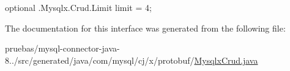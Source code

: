 {\ttfamily optional .Mysqlx.\+Crud.\+Limit limit = 4;} 

The documentation for this interface was generated from the following file\+:\begin{DoxyCompactItemize}
\item 
pruebas/mysql-\/connector-\/java-\/8../src/generated/java/com/mysql/cj/x/protobuf/\mbox{\hyperlink{_mysqlx_crud_8java}{Mysqlx\+Crud.\+java}}\end{DoxyCompactItemize}
